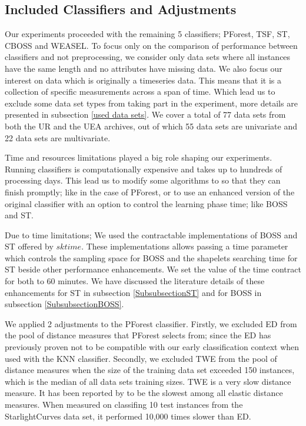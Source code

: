 \subsection{Included Classifiers and Adjustments}
\label{SubsectionIncludedClassifiers}
Our experiments proceeded with the remaining 5 classifiers; PForest, TSF, ST, CBOSS and WEASEL.
To focus only on the comparison of performance between classifiers and not preprocessing, we consider only data sets where all instances have the same length and no attributes have missing data.
We also focus our interest on data which is originally a timeseries data. This means that it is a collection of specific measurements across a span of time.
Which lead us to exclude some data set types from taking part in the experiment, more details are presented in subsection \ref{used data sets}.
We cover a total of 77 data sets from both the UR and the UEA archives, out of which 55 data sets are univariate and 22 data sets are multivariate.

Time and resources limitations played a big role shaping our experiments. Running classifiers is computationally expensive \cite{schafer2020teaser}
and takes up to hundreds of processing days.
This lead us to modify some algorithms to so that they can finish promptly; like in the case of PForest, or to use an enhanced version of the original
classifier with an option to control the learning phase time; like BOSS and ST.

Due to time limitations; We used the contractable implementations of BOSS and ST offered by $sktime$.
These implementations allows passing a time parameter which controls the sampling space for BOSS and the shapelets searching time for ST
beside other performance enhancements.
We set the value of the time contract for both to 60 minutes.
We have discussed the literature details of these enhancements for ST in subsection \ref{SubsubsectionST} and for BOSS in subsection \ref{SubsubsectionBOSS}.

We applied 2 adjustments to the PForest classifier.
Firstly, we excluded ED from the pool of distance measures that PForest selects from; since the ED has previously proven not to be compatible with our early classification context when used with the KNN classifier.
Secondly, we excluded TWE from the pool of distance measures when the size of the training data set exceeded 150 instances, which is the median of all data sets training sizes.
TWE is a very slow distance measure. It has been reported by \cite{bagnall2017great} to be the slowest among all elastic distance measures. When measured on classifing 10 test instances from the
StarlightCurves data set, it performed 10,000 times slower than ED.